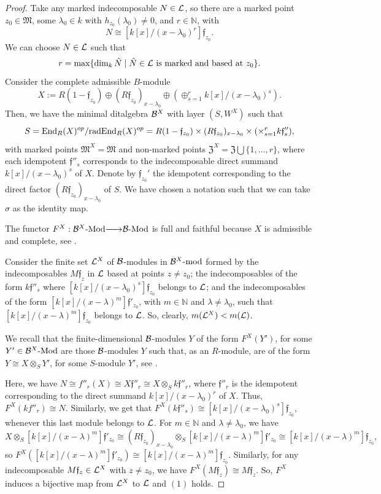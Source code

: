 \documentclass{article}
\theoremstyle{definition}
\newcommand{\End}{{ \rm End }}
\newcommand{\Mod}{{ \rm Mod }}
\newcommand{\rad}{{ \rm rad }}
\renewcommand{\frak}{\mathfrak}
\newcommand{\g}{\hbox{-}}
\newcommand{\hueca}[1]{\mathbb{#1}}
\renewcommand{\mod}{{\rm mod }}
\newcommand{\rightmap}[1]{\smash{\mathop{\hbox to 
20pt{\rightarrowfill}}\limits^{#1}}}
\begin{document}
\begin{proof} Take any marked indecomposable $N\in {\cal L}$, so there are a marked point $z_0\in \frak{M}$, some $\lambda_0\in k$ with $h_{z_0}(\lambda_0)\not=0$, and $r\in \hueca{N}$, with $$N\cong [k[x]/(x-\lambda_0)^r]\frak{f}_{z_0}.$$
We can choose $N\in {\cal L}$ such that 
$$r=\max\{\dim_k \hat{N}\mid \hat{N}\in {\cal L} \hbox{ is marked and based at }z_0\}.$$
Consider the complete admissible $B$-module 
$$X:=R(1-\frak{f}_{z_0})\oplus (R\frak{f}_{z_0})_{x-\lambda_0}\oplus (\oplus_{s=1}^rk[x]/(x-\lambda_0)^s).$$  
Then, we have the minimal ditalgebra ${\cal B}^X$ with layer $(S,W^X)$ such that 
$$S=\End_R(X)^{op}/\rad\End_R(X)^{op} =R(1-\frak{f}_{z_0})\times (R\frak{f}_{z_0})_{x-\lambda_0}\times (\times_{s=1}^r k\frak{f}''_s),$$
with marked points $\frak{M}^X=\frak{M}$ and non-marked points $\frak{Z}^X=\frak{Z}\bigcup\{1,\ldots,r\}$, where each idempotent $\frak{f}''_s$ corresponds to the indecomposable direct summand $k[x]/(x-\lambda_0)^s$ of $X$. Denote by  $\frak{f}_{z_0}'$  the idempotent corresponding to the direct factor $(R\frak{f}_{z_0})_{x-\lambda_0}$ of $S$. We have chosen a notation such that we can take $\sigma$ as the identity map. 



The functor $F^X:{\cal B}^X\g\Mod\rightmap{}{\cal B}\g\Mod$ is full and faithful because $X$ is  admissible and complete, see \cite[\S12 and \S13]{BSZ}. 

Consider the finite set ${\cal L}^X$ of ${\cal B}$-modules in ${\cal B}^X\g\mod$ formed by the indecomposables $M\frak{f}_z$ in ${\cal L}$ based at points $z\not= z_0$; the indecomposables of the form $k\frak{f}''_s$ where $[k[x]/(x-\lambda_0)^s]\frak{f}_{z_0}$ belongs to ${\cal L}$; and the indecomposables  of the form $[k[x]/(x-\lambda)^m]\frak{f}'_{z_0}$, with $m\in \hueca{N}$ and $\lambda\not=\lambda_0$, such that $[k[x]/(x-\lambda)^m]\frak{f}_{z_0}$ belongs to ${\cal L}$. So, clearly, $m({\cal L}^X)<m({\cal L})$. 

We recall that the finite-dimensional 
${\cal B}$-modules $Y$ of the form $F^X(Y')$, for some $Y'\in {\cal B}^X\g\Mod$ are those ${\cal B}$-modules  $Y$ such that, as an $R$-module, are of the form $Y\cong X\otimes_SY'$, for some $S$-module $Y'$, see \cite[(16.1)]{BSZ}. 

Here, we have  $N\cong f''_r(X)\cong X\frak{f}''_r\cong X\otimes_Sk\frak{f}''_r$, where $\frak{f}''_r$ is the idempotent corresponding to the direct summand 
$k[x]/(x-\lambda_0)^r$ of $X$. Thus, $F^X(kf''_r)\cong N$. Similarly, we get that $F^X(k\frak{f}''_s)\cong [k[x]/(x-\lambda_0)^s]\frak{f}_{z_0}$, whenever this last module belongs to ${\cal L}$.    
For $m\in \hueca{N}$ and $\lambda\not=\lambda_0$, we have 
$$X\otimes_S [k[x]/(x-\lambda)^m]\frak{f}'_{z_0}\cong (R\frak{f}_{z_0})_{x-\lambda_0}\otimes_S[k[x]/(x-\lambda)^m]\frak{f}'_{z_0}\cong [k[x]/(x-\lambda)^m]\frak{f}_{z_0},$$
so $F^X([k[x]/(x-\lambda)^m]\frak{f}'_{z_0})\cong [k[x]/(x-\lambda)^m]\frak{f}_{z_0}$. 
 Similarly, for any indecomposable $M\frak{f}_z\in {\cal L}^X$ with $z\not=z_0$, we have $F^X(M\frak{f}_z)\cong M\frak{f}_z$. So,   $F^X$ induces a bijective map from ${\cal L}^X$ to ${\cal L}$ and $(1)$  holds. 


\end{proof}
\end{document}
